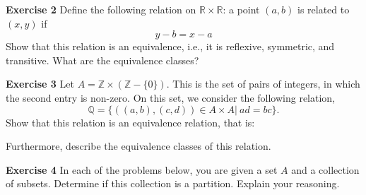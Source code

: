 \documentclass[12pt,oneside]{exam}
\newenvironment{exercise}[1]{\vspace{.1in}\noindent\textbf{Exercise #1 \hspace{.05em}}}{}
\begin{document}
\begin{exercise}{2}
Define the following relation on $\mathbb{R} \times \mathbb{R}$: a point $(a,b)$ is related to $(x,y)$ if 
\begin{equation*}
y-b=x-a
\end{equation*}
Show that this relation is an equivalence, i.e., it is reflexive, symmetric, and transitive. What are the equivalence classes?
\end{exercise}

\begin{exercise}{3}
Let $A = \mathbb{Z} \times (\mathbb{Z}-\{0\})$. This is the set of pairs of integers, in which the second entry is non-zero. On this set, we consider the following relation, 
\begin{equation*}
\mathbb{Q}=\{ ((a,b), (c,d)) \in A \times A| \ ad=bc\}.
\end{equation*}
Show that this relation is an equivalence relation, that is:

Furthermore, describe the equivalence classes of this relation. 
\end{exercise}

\begin{exercise}{4}
In each of the problems below, you are given a set $A$ and a collection of subsets. Determine if this collection is a partition. Explain your reasoning. 
\end{exercise}
\end{document}
